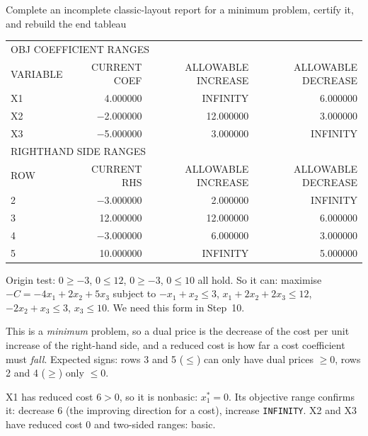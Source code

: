 \begin{worked}{Complete an incomplete classic-layout report for a minimum problem, certify it, and rebuild the end tableau}
\begin{center}
\medskip
\begin{tabular}{lrrr}
\multicolumn{4}{l}{OBJ COEFFICIENT RANGES}\\
VARIABLE & CURRENT COEF & ALLOWABLE INCREASE & ALLOWABLE DECREASE\\
X1 & 4.000000 & INFINITY & 6.000000\\
X2 & $-$2.000000 & 12.000000 & 3.000000\\
X3 & $-$5.000000 & 3.000000 & INFINITY\\[3pt]
\multicolumn{4}{l}{RIGHTHAND SIDE RANGES}\\
ROW & CURRENT RHS & ALLOWABLE INCREASE & ALLOWABLE DECREASE\\
2 & $-$3.000000 & 2.000000 & INFINITY\\
3 & 12.000000 & 12.000000 & 6.000000\\
4 & $-$3.000000 & 6.000000 & 3.000000\\
5 & 10.000000 & INFINITY & 5.000000\\
\end{tabular}
\end{center}

Origin test: $0\ge -3$, $0\le 12$, $0\ge -3$, $0\le 10$ all hold. So it
can: maximise $-C=-4x_{1}+2x_{2}+5x_{3}$ subject to $-x_{1}+x_{2}\le 3$,
$x_{1}+2x_{2}+2x_{3}\le 12$, $-2x_{2}+x_{3}\le 3$, $x_{3}\le 10$. We need
this form in Step~10.

This is a \emph{minimum} problem, so a dual price is the decrease of the
cost per unit increase of the right-hand side, and a reduced cost is how far
a cost coefficient must \emph{fall}. Expected signs: rows 3 and 5 ($\le$)
can only have dual prices $\ge 0$, rows 2 and 4 ($\ge$) only $\le 0$.

X1 has reduced cost $6>0$, so it is nonbasic: $x_{1}^{*}=0$. Its objective
range confirms it: decrease $6$ (the improving direction for a cost),
increase \texttt{INFINITY}. X2 and X3 have reduced cost $0$ and two-sided
ranges: basic.


\end{worked}
